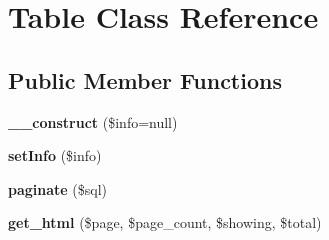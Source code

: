 \hypertarget{class_table}{
\section{Table Class Reference}
\label{class_table}
}
\subsection*{Public Member Functions}
\begin{DoxyCompactItemize}
\item 
\hypertarget{class_table_ae806358de814bd5e78b3a60d88c4f202}{
{\bfseries \_\-\_\-construct} (\$info=null)}
\label{class_table_ae806358de814bd5e78b3a60d88c4f202}

\item 
\hypertarget{class_table_a900f31c9142fccc1f406f233b1a09f35}{
{\bfseries setInfo} (\$info)}
\label{class_table_a900f31c9142fccc1f406f233b1a09f35}

\item 
\hypertarget{class_table_a99be3be964bac8e1a40a09ac82869268}{
{\bfseries paginate} (\$sql)}
\label{class_table_a99be3be964bac8e1a40a09ac82869268}

\item 
\hypertarget{class_table_a64a5c5fec7e9ad8981961a417126931e}{
{\bfseries get\_\-html} (\$page, \$page\_\-count, \$showing, \$total)}
\label{class_table_a64a5c5fec7e9ad8981961a417126931e}

\end{DoxyCompactItemize}
